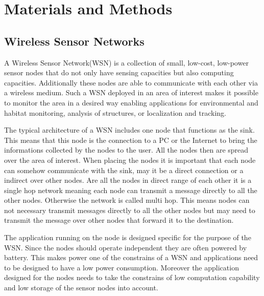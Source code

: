 \chapter{Materials and Methods}

\section{Wireless Sensor Networks}
A Wireless Sensor Network(WSN) is a collection of small, low-cost, low-power sensor nodes that do not only have sensing capacities but also computing capacities. Additionally these nodes are able to communicate with each other via a wireless medium. Such a WSN deployed in an area of interest makes it possible to monitor the area in a desired way enabling applications for environmental and habitat monitoring, analysis of structures, or localization and tracking.

The typical architecture of a WSN includes one node that functions as the sink. This means that this node is the connection to a PC or the Internet to bring the informations collected by the nodes to the user. All the nodes then are spread over the area of interest. When placing the nodes it is important that each node can somehow communicate with the sink, may it be a direct connection or a indirect over other nodes. Are all the nodes in direct range of each other it is a single hop network meaning each node can transmit a message directly to all the other nodes. Otherwise the network is called multi hop. This means nodes can not necessary transmit messages directly to all the other nodes but may need to transmit the message over other nodes that forward it to the destination.

The application running on the node is designed specific for the purpose of the WSN. Since the nodes should operate independent they are often powered by battery. This makes power one of the constrains of a WSN and applications need to be designed to have a low power consumption. Moreover the application designed for the nodes needs to take the constrains of low computation capability and low storage of the sensor nodes into account.  \cite{Wsn} \cite{Tinyos} 

	

